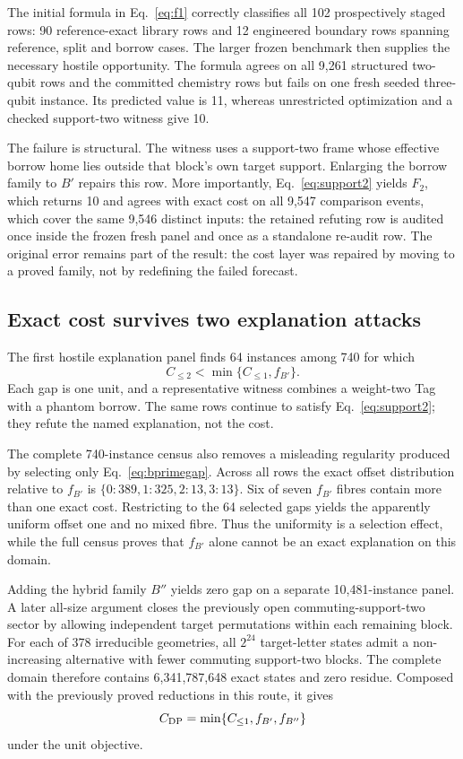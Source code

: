 The initial formula in Eq.~\eqref{eq:f1} correctly classifies all 102 prospectively staged rows: 90 reference-exact library rows and 12 engineered boundary rows spanning reference, split and borrow cases.  The larger frozen benchmark then supplies the necessary hostile opportunity.  The formula agrees on all 9,261 structured two-qubit rows and the committed chemistry rows but fails on one fresh seeded three-qubit instance.  Its predicted value is 11, whereas unrestricted optimization and a checked support-two witness give 10.

The failure is structural.  The witness uses a support-two frame whose effective borrow home lies outside that block's own target support.  Enlarging the borrow family to $B'$ repairs this row.  More importantly, Eq.~\eqref{eq:support2} yields $F_2$, which returns 10 and agrees with exact cost on all 9,547 comparison events, which cover the same 9,546 distinct inputs: the retained refuting row is audited once inside the frozen fresh panel and once as a standalone re-audit row.  The original error remains part of the result: the cost layer was repaired by moving to a proved family, not by redefining the failed forecast.

\subsection{Exact cost survives two explanation attacks}

The first hostile explanation panel finds 64 instances among 740 for which
\begin{equation}
 C_{\le2}<\min\{C_{\le1},f_{B'}\}.
 \label{eq:bprimegap}
\end{equation}
Each gap is one unit, and a representative witness combines a weight-two Tag with a phantom borrow.  The same rows continue to satisfy Eq.~\eqref{eq:support2}; they refute the named explanation, not the cost.

The complete 740-instance census also removes a misleading regularity produced by selecting only Eq.~\eqref{eq:bprimegap}.  Across all rows the exact offset distribution relative to $f_{B'}$ is $\{0:389,1:325,2:13,3:13\}$.  Six of seven $f_{B'}$ fibres contain more than one exact cost.  Restricting to the 64 selected gaps yields the apparently uniform offset one and no mixed fibre.  Thus the uniformity is a selection effect, while the full census proves that $f_{B'}$ alone cannot be an exact explanation on this domain.

Adding the hybrid family $B''$ yields zero gap on a separate 10,481-instance panel.  A later all-size argument closes the previously open commuting-support-two sector by allowing independent target permutations within each remaining block.  For each of 378 irreducible geometries, all $2^{24}$ target-letter states admit a non-increasing alternative with fewer commuting support-two blocks.  The complete domain therefore contains 6,341,787,648 exact states and zero residue.  Composed with the previously proved reductions in this route, it gives
\begin{equation}
 C_{\rm DP}=\min\{C_{\le1},f_{B'},f_{B''}\}
 \label{eq:envelope}
\end{equation}
under the unit objective.

